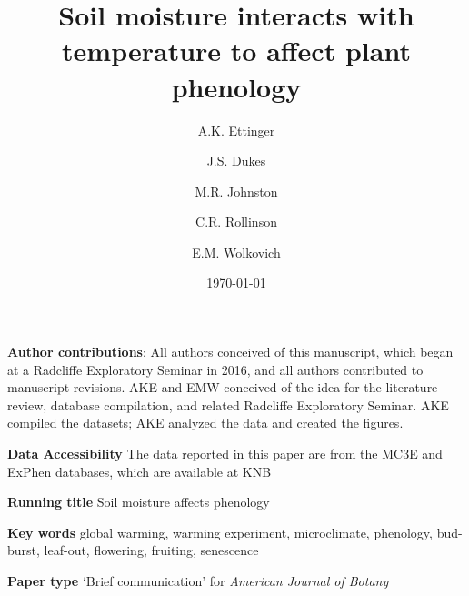 \documentclass{article}
\begin{document}



\title{Soil moisture interacts with temperature to affect plant phenology} %
\author[1,2,a]{A.K. Ettinger}
\author[3,b]{J.S. Dukes}
\author[4,c]{M.R. Johnston}
\author[5,d]{C.R. Rollinson}
\author[1,4,6,e]{E.M. Wolkovich}









\date{\today}
\maketitle %
\textbf{Author contributions}: All authors conceived of this manuscript, which began at a Radcliffe Exploratory Seminar in 2016, and all authors contributed to manuscript revisions. AKE and EMW conceived of the idea for the literature review, database compilation, and related Radcliffe Exploratory Seminar. AKE compiled the datasets; AKE analyzed the data and created the figures.

\textbf{Data Accessibility} 
The data reported in this paper are from the MC3E and ExPhen databases, which are available at KNB \citep{ettinger2018,ettinger2021}

\textbf{Running title} Soil moisture affects phenology

\textbf{Key words} global warming, warming experiment, microclimate, phenology, bud-burst, leaf-out, flowering, fruiting, senescence 


\textbf{Paper type} `Brief communication' for \emph{American Journal of Botany}
\end{document}
